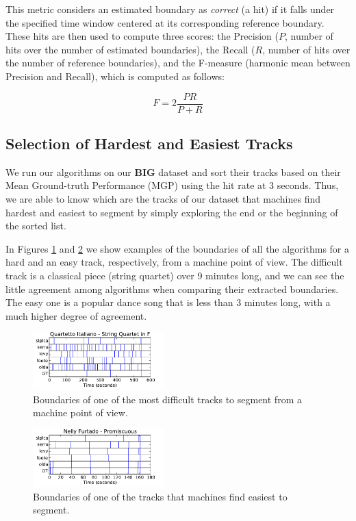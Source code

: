 \documentclass{article}
\begin{document}
This metric considers an estimated boundary as \emph{correct} (a hit) if it falls under the specified time window centered at its corresponding reference boundary.
These hits are then used to compute three scores: the Precision ($P$, number of hits over the number of estimated boundaries), the Recall ($R$, number of hits over the number of reference boundaries), and the F-measure (harmonic mean between Precision and Recall), which is computed as follows:

\begin{equation}
  F = 2 \frac{P R}{P + R}
\end{equation}

\subsection{Selection of Hardest and Easiest Tracks}\label{sub:hard-easy}

We run our algorithms on our \textbf{BIG} dataset and sort their tracks based on their Mean Ground-truth Performance (MGP) using the hit rate at 3 seconds.
Thus, we are able to know which are the tracks of our dataset that machines find hardest and easiest to segment by simply exploring the end or the beginning of the sorted list.

In Figures \ref{fig:quartetto} and \ref{fig:promiscuous} we show examples of the boundaries of all the algorithms for a hard and an easy track, respectively, from a machine point of view.
The difficult track is a classical piece (string quartet) over 9 minutes long, and we can see the little agreement among algorithms when comparing their extracted boundaries.
The easy one is a popular dance song that is less than 3 minutes long, with a much higher degree of agreement.

\begin{figure}
  \centering
  \includegraphics[width=0.45\textwidth, height=0.13\textheight]{plots/Quartetto-machine.pdf}
  \caption{Boundaries of one of the most difficult tracks to segment from a machine point of view.}
  \label{fig:quartetto}
\end{figure}%

\begin{figure}
  \centering
  \includegraphics[width=0.45\textwidth, height=0.13\textheight]{plots/Promiscuous-machine.pdf}
  \caption{Boundaries of one of the tracks that machines find easiest to segment.}
  \label{fig:promiscuous}
\end{figure}%
\end{document}
